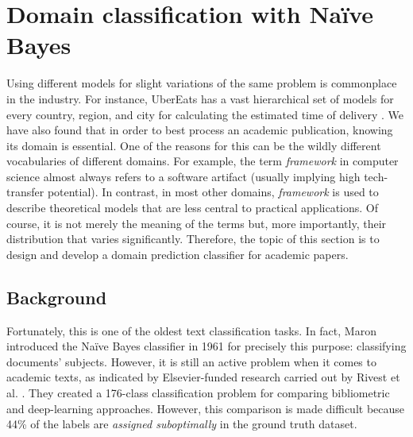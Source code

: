 \newpage
\section{Domain classification with Naïve Bayes} \label{section:simple-case}

Using different models for slight variations of the same problem is commonplace in the industry. For instance, UberEats has a vast hierarchical set of models for every country, region, and city for calculating the estimated time of delivery \cite{li2017scaling}. We have also found that in order to best process an academic publication, knowing its domain is essential. One of the reasons for this can be the wildly different vocabularies of different domains. For example, the term \textit{framework} in computer science almost always refers to a software artifact (usually implying high tech-transfer potential). In contrast, in most other domains, \textit{framework} is used to describe theoretical models that are less central to practical applications. Of course, it is not merely the meaning of the terms but, more importantly, their distribution that varies significantly. Therefore, the topic of this section is to design and develop a domain prediction classifier for academic papers.

\subsection{Background}

Fortunately, this is one of the oldest text classification tasks. In fact, Maron introduced the Naïve Bayes classifier in 1961 \cite{maron1961automatic} for precisely this purpose: classifying documents' subjects. However, it is still an active problem when it comes to academic texts, as indicated by Elsevier-funded research carried out by Rivest et al. \cite{rivest2021level}. They created a 176-class classification problem for comparing bibliometric and deep-learning approaches. However, this comparison is made difficult because 44\% of the labels are \textit{assigned suboptimally} in the ground truth dataset.

